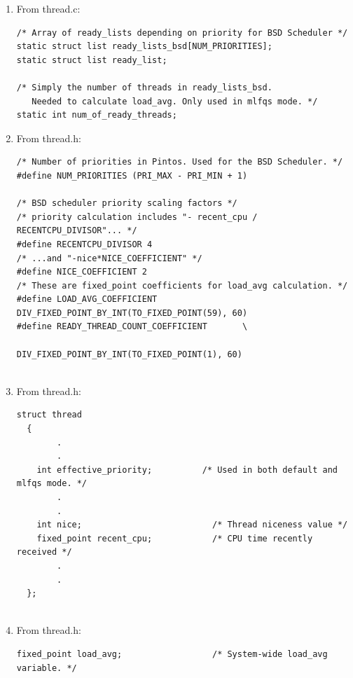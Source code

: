 \documentclass{article}
\renewcommand{\_}{\char`_}
\begin{document}
\begin{enumerate}

\item From thread.c: 
\begin{lstlisting}
/* Array of ready_lists depending on priority for BSD Scheduler */
static struct list ready_lists_bsd[NUM_PRIORITIES];
static struct list ready_list;

/* Simply the number of threads in ready_lists_bsd.
   Needed to calculate load_avg. Only used in mlfqs mode. */
static int num_of_ready_threads;

\end{lstlisting}


\item From thread.h:
\begin{lstlisting}
/* Number of priorities in Pintos. Used for the BSD Scheduler. */
#define NUM_PRIORITIES (PRI_MAX - PRI_MIN + 1)

/* BSD scheduler priority scaling factors */
/* priority calculation includes "- recent_cpu / RECENTCPU_DIVISOR"... */
#define RECENTCPU_DIVISOR 4
/* ...and "-nice*NICE_COEFFICIENT" */
#define NICE_COEFFICIENT 2
/* These are fixed_point coefficients for load_avg calculation. */
#define LOAD_AVG_COEFFICIENT DIV_FIXED_POINT_BY_INT(TO_FIXED_POINT(59), 60)
#define READY_THREAD_COUNT_COEFFICIENT       \
                              DIV_FIXED_POINT_BY_INT(TO_FIXED_POINT(1), 60)
                              
\end{lstlisting}

\newpage

\item From thread.h:
\begin{lstlisting}
struct thread
  {
        .
        .
    int effective_priority;          /* Used in both default and mlfqs mode. */
        .
        .
    int nice;                          /* Thread niceness value */
    fixed_point recent_cpu;            /* CPU time recently received */
        .
        .
  };
  
\end{lstlisting}

\item From thread.h:
\begin{lstlisting}
fixed_point load_avg;                  /* System-wide load_avg variable. */

\end{lstlisting}

\end{enumerate}
\end{document}
